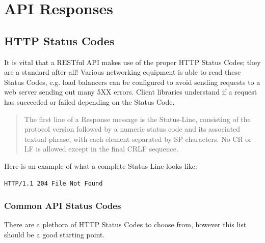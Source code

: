 \documentclass{book}
\begin{document}
\chapter{API Responses}

\section{HTTP Status Codes}

It is vital that a RESTful API makes use of the proper HTTP Status Codes; they are a standard after all! Various networking equipment is able to read these Status Codes, e.g. load balancers can be configured to avoid sending requests to a web server sending out many 5XX errors. Client libraries understand if a request has succeeded or failed depending on the Status Code.

\begin{quote}
The first line of a Response message is the Status-Line, consisting of the protocol version followed by a numeric status code and its associated textual phrase, with each element separated by SP characters. No CR or LF is allowed except in the final CRLF sequence.\cite{RFC2616}
\end{quote}

Here is an example of what a complete Status-Line looks like:

\begin{verbatim}
HTTP/1.1 204 File Not Found
\end{verbatim}

\subsection{Common API Status Codes}

There are a plethora of HTTP Status Codes \cite{RFC2616} to choose from, however this list should be a good starting point.
\end{document}
